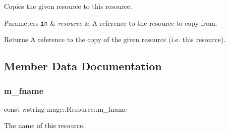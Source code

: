 Copies the given resource to this resource.


\begin{DoxyParams}[1]{Parameters}
\mbox{\tt in}  & {\em resource} & A reference to the resource to copy from. \\
\hline
\end{DoxyParams}
\begin{DoxyReturn}{Returns}
A reference to the copy of the given resource (i.\+e. this resource). 
\end{DoxyReturn}


\subsection{Member Data Documentation}
\hypertarget{classmage_1_1_resource_a79267ab1f2ece139405dbe8b4b4d69fa}{}\label{classmage_1_1_resource_a79267ab1f2ece139405dbe8b4b4d69fa} 
\subsubsection{\texorpdfstring{m\+\_\+fname}{m\_fname}}
{\footnotesize\ttfamily const wstring mage\+::\+Resource\+::m\+\_\+fname\hspace{0.3cm}{\ttfamily [private]}}

The name of this resource. 